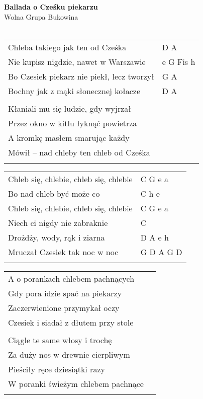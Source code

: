 \documentclass[a5paper]{article}
\begin{document}


\noindent
\fontsize{12pt}{15pt}\selectfont
\textbf{Ballada o Cześku piekarzu} \\
\fontsize{8pt}{10pt}\selectfont
Wolna Grupa Bukowina \\ \\
\fontsize{10pt}{12pt}\selectfont
{}
\begin{tabular}{@{}p{8.5cm}p{3cm}@{}}
\noindent
Chleba takiego jak ten od Cześka & D A \\
Nie kupisz nigdzie, nawet w Warszawie & e G Fis h \\
Bo Czesiek piekarz nie piekł, lecz tworzył & G A \\
Bochny jak z mąki słonecznej kołacze & D A \\ \\

Kłaniali mu się ludzie, gdy wyjrzał \\
Przez okno w kitlu łyknąć powietrza \\
A kromkę masłem smarując każdy \\
Mówił – nad chleby ten chleb od Cześka \\ \\
\end{tabular}

\noindent
\begin{tabular}{@{}p{7.5cm}p{3cm}@{}}
Chleb się, chlebie, chleb się, chlebie & C G e a \\
Bo nad chleb być może co & C h e \\
Chleb się, chlebie, chleb się, chlebie & C G e a \\
Niech ci nigdy nie zabraknie & C \\
Drożdży, wody, rąk i ziarna & D A e h \\
Mruczał Czesiek tak noc w noc & G D A G D \\ \\
\end{tabular}

\noindent
\begin{tabular}{@{}p{8.5cm}p{3cm}@{}}
A o porankach chlebem pachnących \\
Gdy pora idzie spać na piekarzy \\
Zaczerwienione przymykał oczy \\
Czesiek i siadał z dłutem przy stole \\ \\
 
Ciągle te same włosy i trochę \\
Za duży nos w drewnie cierpliwym \\
Pieściły ręce dziesiątki razy \\
W poranki świeżym chlebem pachnące \\ \\
\end{tabular}
\end{document}

